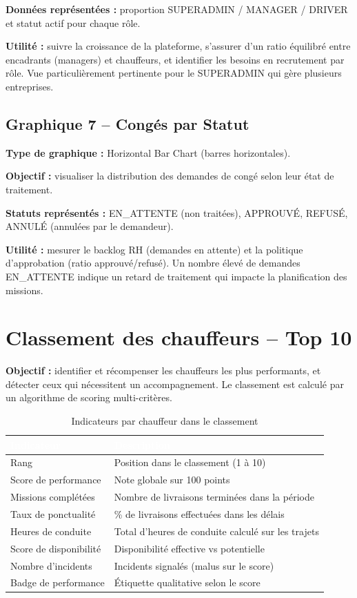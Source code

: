 \documentclass[12pt,a4paper]{report}
\newcommand{\thead}[1]{\cellcolor{tablehead}\textcolor{white}{\textbf{#1}}}
\begin{document}
\textbf{Données représentées :} proportion SUPERADMIN / MANAGER / DRIVER
et statut actif pour chaque rôle.

\textbf{Utilité :} suivre la croissance de la plateforme, s'assurer d'un
ratio équilibré entre encadrants (managers) et chauffeurs, et identifier
les besoins en recrutement par rôle. Vue particulièrement pertinente pour
le SUPERADMIN qui gère plusieurs entreprises.

\subsection{Graphique 7 -- Congés par Statut}

\textbf{Type de graphique :} Horizontal Bar Chart (barres horizontales).

\textbf{Objectif :} visualiser la distribution des demandes de congé
selon leur état de traitement.

\textbf{Statuts représentés :} EN\_ATTENTE (non traitées), APPROUVÉ,
REFUSÉ, ANNULÉ (annulées par le demandeur).

\textbf{Utilité :} mesurer le backlog RH (demandes en attente) et la
politique d'approbation (ratio approuvé/refusé). Un nombre élevé de
demandes EN\_ATTENTE indique un retard de traitement qui impacte la
planification des missions.

\section{Classement des chauffeurs -- Top 10}
\label{sec:ch8-classement}

\textbf{Objectif :} identifier et récompenser les chauffeurs les plus
performants, et détecter ceux qui nécessitent un accompagnement. Le
classement est calculé par un algorithme de scoring multi-critères.

\begin{table}[H]
  \centering
  \caption{Indicateurs par chauffeur dans le classement}
  \label{tab:kpi_classement}
  \begin{tabularx}{\textwidth}{|l|Y|}
    \hline
    \thead{Indicateur} & \thead{Description} \\
    \hline
    Rang & Position dans le classement (1 à 10) \\
    Score de performance & Note globale sur 100 points \\
    Missions complétées & Nombre de livraisons terminées dans la période \\
    Taux de ponctualité & \% de livraisons effectuées dans les délais \\
    Heures de conduite & Total d'heures de conduite calculé sur les trajets \\
    Score de disponibilité & Disponibilité effective vs potentielle \\
    Nombre d'incidents & Incidents signalés (malus sur le score) \\
    Badge de performance & Étiquette qualitative selon le score \\
    \hline
  \end{tabularx}
\end{table}
\end{document}
